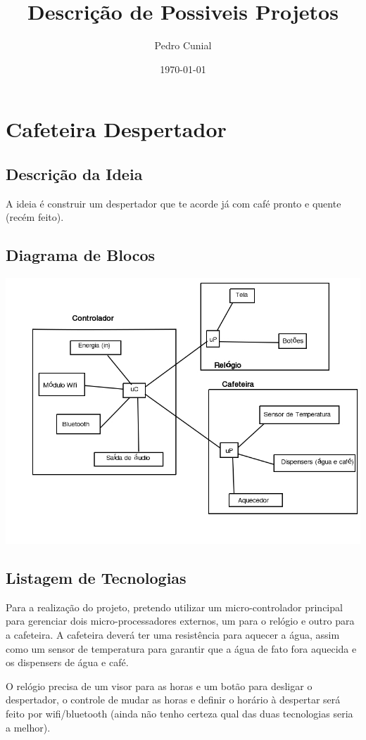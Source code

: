 \documentclass[11pt]{article}
\author{Pedro Cunial}
\date{\today}
\title{Descrição de Possiveis Projetos}
\begin{document}
\maketitle
\tableofcontents


\section{Cafeteira Despertador}
\subsection{Descrição da Ideia}
\label{sec:orgheadline1}
A ideia é construir um despertador que te acorde já com café pronto e quente
(recém feito).
\subsection{Diagrama de Blocos}
\label{sec:orgheadline2}
\includegraphics[width=\textwidth]{diagrama-cafeteira}
\subsection{Listagem de Tecnologias}
\label{sec:orgheadline3}
Para a realização do projeto, pretendo utilizar um micro-controlador principal
para gerenciar dois micro-processadores externos, um para o relógio e outro
para a cafeteira. A cafeteira deverá ter uma resistência para aquecer a água,
assim como um sensor de temperatura para garantir que a água de fato fora
aquecida e os dispensers de água e café.

O relógio precisa de um visor para as horas e um botão para desligar o
despertador, o controle de mudar as horas e definir o horário à despertar será
feito por wifi/bluetooth (ainda não tenho certeza qual das duas tecnologias
seria a melhor).
\end{document}
